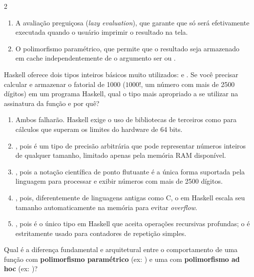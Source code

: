 \documentclass[a4paper,10pt,brazil]{article}
\begin{document}
\begin{multicols}{2}
\begin{enumerate}
  \item A avaliação preguiçosa (\emph{lazy evaluation}), que garante que  só será efetivamente executada quando o usuário imprimir o resultado na tela.

  \item O polimorfismo paramétrico, que permite que o resultado seja armazenado em cache independentemente de o argumento ser  ou .


\end{enumerate}

Haskell oferece dois tipos inteiros básicos muito utilizados:  e . Se você precisar calcular e armazenar o fatorial de 1000 ($1000!$, um número com mais de 2500 dígitos) em um programa Haskell, qual o tipo mais apropriado a se utilizar na assinatura da função e por quê?

\begin{enumerate}
  \item Ambos falharão. Haskell exige o uso de bibliotecas de terceiros como  para cálculos que superam os limites do hardware de 64 bits.

  \item {}, pois é um tipo de precisão arbitrária que pode representar números inteiros de qualquer tamanho, limitado apenas pela memória RAM disponível.

  \item {}, pois a notação científica de ponto flutuante é a única forma suportada pela linguagem para processar e exibir números com mais de 2500 dígitos.

  \item {}, pois, diferentemente de linguagens antigas como C, o  em Haskell escala seu tamanho automaticamente na memória para evitar \emph{overflow}.

  \item {}, pois é o único tipo em Haskell que aceita operações recursivas profundas; o  é estritamente usado para contadores de repetição simples.


\end{enumerate}

Qual é a diferença fundamental e arquitetural entre o comportamento de uma função com \textbf{polimorfismo paramétrico} (ex: ) e uma com \textbf{polimorfismo ad hoc} (ex: )?


\end{multicols}
\end{document}
